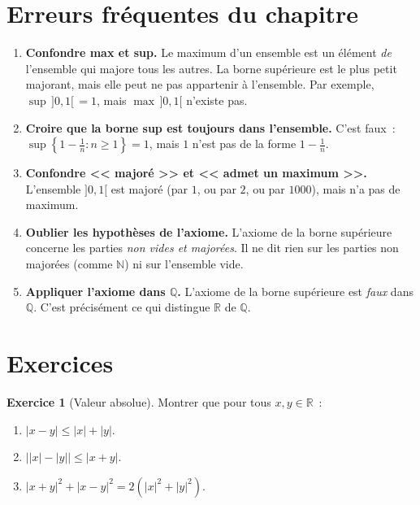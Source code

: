 \documentclass[12pt,a4paper,openany]{book}
\theoremstyle{definition}
\newtheorem{exercice}{Exercice}[chapter]
\newcommand{\N}{\mathbb{N}}
\newcommand{\Q}{\mathbb{Q}}
\newcommand{\R}{\mathbb{R}}
\newcommand{\abs}[1]{\left\lvert #1 \right\rvert}
\begin{document}
\section*{Erreurs fréquentes du chapitre}

\begin{errmark}
  \begin{enumerate}
    \item \textbf{Confondre max et sup.} Le maximum d'un ensemble est un élément \emph{de} l'ensemble qui majore tous les autres. La borne supérieure est le plus petit majorant, mais elle peut ne pas appartenir à l'ensemble. Par exemple, $\sup\, ]0,1[ \,= 1$, mais $\max\, ]0,1[$ n'existe pas.
    \item \textbf{Croire que la borne sup est toujours dans l'ensemble.} C'est faux~: $\sup\left\{1 - \frac{1}{n} : n \geq 1\right\} = 1$, mais $1$ n'est pas de la forme $1 - \frac{1}{n}$.
    \item \textbf{Confondre << majoré >> et << admet un maximum >>.} L'ensemble $]0,1[$ est majoré (par $1$, ou par $2$, ou par $1000$), mais n'a pas de maximum.
    \item \textbf{Oublier les hypothèses de l'axiome.} L'axiome de la borne supérieure concerne les parties \emph{non vides et majorées}. Il ne dit rien sur les parties non majorées (comme $\N$) ni sur l'ensemble vide.
    \item \textbf{Appliquer l'axiome dans $\Q$.} L'axiome de la borne supérieure est \emph{faux} dans $\Q$. C'est précisément ce qui distingue $\R$ de $\Q$.
  \end{enumerate}
\end{errmark}


\section*{Exercices}

\begin{exercice}[Valeur absolue]\label{exo:exo-val-abs}
  Montrer que pour tous $x, y \in \R$~:
  \begin{enumerate}[label=(\alph*)]
    \item $\abs{x - y} \leq \abs{x} + \abs{y}$.
    \item $\abs{\abs{x} - \abs{y}} \leq \abs{x + y}$.
    \item $\abs{x + y}^2 + \abs{x - y}^2 = 2(\abs{x}^2 + \abs{y}^2)$.
  \end{enumerate}
\end{exercice}
\end{document}
